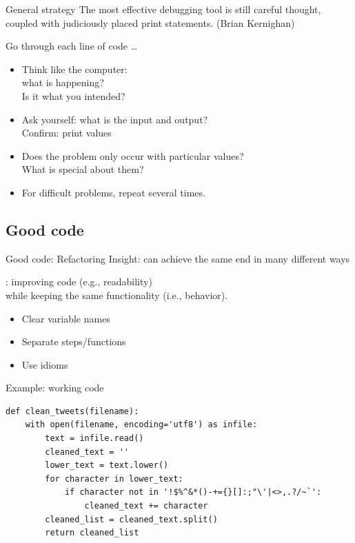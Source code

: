 \documentclass[aspectratio=169,usenames,dvipsnames]{beamer}
\begin{document}
\begin{frame}{General strategy}
    The most effective debugging tool is still careful thought, coupled with
    judiciously placed print statements. (Brian Kernighan)
    
    \pause\vspace{1em}
    Go through each line of code \dots
    \begin{itemize}
        \item Think like the computer: \\
            what is happening? \\
            Is it what you intended?
        \item Ask yourself: what is the input and output? \\
            Confirm: print values
        \item Does the problem only occur with particular values? \\
            What is special about them?
        \item For difficult problems, repeat several times.
    \end{itemize}
\end{frame}



\subsection{Good code}
\begin{frame}{Good code: Refactoring}
    Insight: can achieve the same end in many different ways

    \pause
    \begin{definition}
        : improving code (e.g., readability) \\
            while keeping the same functionality (i.e., behavior).
    \end{definition}

    \begin{itemize}
        \item Clear variable names
        \item Separate steps/functions
        \item Use idioms
    \end{itemize}
\end{frame}

\begin{frame}[fragile]{Example: working code}
\begin{lstlisting}
def clean_tweets(filename):
    with open(filename, encoding='utf8') as infile:
        text = infile.read()
        cleaned_text = ''
        lower_text = text.lower()
        for character in lower_text:
            if character not in '!$%^&*()-+={}[]:;"\'|<>,.?/~`':
                cleaned_text += character
        cleaned_list = cleaned_text.split()
        return cleaned_list
\end{lstlisting}
\end{frame}
\end{document}
